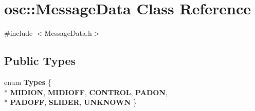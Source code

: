 \hypertarget{classosc_1_1MessageData}{}\section{osc\+:\+:Message\+Data Class Reference}
\label{classosc_1_1MessageData}


{\ttfamily \#include $<$Message\+Data.\+h$>$}

\subsection*{Public Types}
\begin{DoxyCompactItemize}
\item 
enum {\bfseries Types} \{ \\*
{\bfseries M\+I\+D\+I\+ON}, 
{\bfseries M\+I\+D\+I\+O\+FF}, 
{\bfseries C\+O\+N\+T\+R\+OL}, 
{\bfseries P\+A\+D\+ON}, 
\\*
{\bfseries P\+A\+D\+O\+FF}, 
{\bfseries S\+L\+I\+D\+ER}, 
{\bfseries U\+N\+K\+N\+O\+WN}
 \}\hypertarget{classosc_1_1MessageData_aa4971419f49aa2874d36482029c5e8e5}{}\label{classosc_1_1MessageData_aa4971419f49aa2874d36482029c5e8e5}

\end{DoxyCompactItemize}
